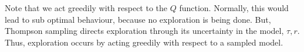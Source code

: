 Note that we act greedily with respect to the $Q$ function. Normally, this would
lead to sub optimal behaviour, because no exploration is being done. But, Thompson sampling
directs exploration through its uncertainty in the model, $\tau, r$. Thus,
exploration occurs by acting greedily with respect to a sampled model.

%
%
%
%
%
%
%
%
%
%
%

